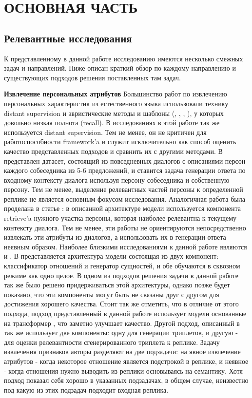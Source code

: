 \chapter{\centering\normalsize{ОСНОВНАЯ ЧАСТЬ}}

\section{Релевантные исследования}
К представленному в данной работе исследованию имеются несколько смежных задач и направлений. Ниже описан краткий обзор по каждому направлению и существующих подходов решения поставленных там задач.

\textbf{Извлечение персональных атрибутов}  Большинство работ по извлечению персональных характеристик из естественного языка использовали технику distant supervision и эвристические методы и шаблоны (\cite{pappu-rudnicky-2014-knowledge}, \cite{tigunova_2019}, \cite{gtky}, \cite{mazare-etal-2018-training}), у которых довольно низкая полнота (recall). В исследованиях в этой работе так же используется distant supervision. Тем не менее, он не критичен для работоспособности framework'a и служит исключительно как способ оценить качество представленных подходов и сравнить их с другими методами. В \cite{personachat} представлен датасет, состоящий из повседневных диалогов с описаниями персон каждого собеседника из 5-6 предложений, и ставится задача генерации ответа по входному контексту диалога используя персону собеседника и собственную персону. Тем не менее, выделение релевантных частей персоны к определенной реплике не является основным фокусом исследования. Аналогичная работа была проделана в статье \cite{focus}: в описанной архитектуре модели используется компонента retrieve'a нужного участка персоны, которая наиболее релевантна к текущему контексту диалога. Тем не менее, эти работы не ориентируются непосредственно извлекать эти атрибуты из диалогов, а использовать их в генерации ответа неявным образом. Наиболее близкими исследованиями к данной работе являются \cite{gtky} и \cite{genre}. В \cite{gtky} представляется архитектура модели состоящая из двух компонент: классификатор отношений и генератор сущностей, и обе обучаются в сквозном режиме как одно целое. В одном из подходов решения задачи в данной работе так же было решено придерживаться этой архитектуры, однако позже будет показано, что эти компоненты могут быть не связаны друг с другом для достижения хорошего качества. Стоит так же отметить, что в отличие от этого подхода, подход представленный в данной работе использует модели основанные на трансформер \cite{vaswani2017}, что заметно улучшает качество. Другой подход, описанный в \cite{genre} так же использует две компоненты: одну для генерации триплетов, и другую - для оценки релевантности сгенерированного триплета к реплике. Задачу извлечения признаков авторы \cite{genre} разделяют на две подзадачи: на явное извлечение атрибутов - когда некоторое отношение является подстрокой в реплике, и неявное - когда отношения нужно выводить из реплики основываясь на семантику. Хотя подход показал себя хорошо в указанных подзадачах, в общем случае, неизвестно под какую из этих подзадач подходит входная реплика.


